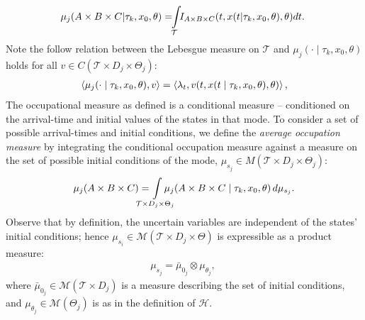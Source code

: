 \small
\begin{align}
\hspace*{-1mm}\mu_j(A\times B\times C| \tau_k ,x_0,\theta)=\hspace*{-1.25mm}\int\limits_{\mathcal T} \hspace*{-1.25mm} I_{A\times B\times C}(t,x(t|\tau_k,x_0,\theta),\theta)dt.
\end{align}
\normalsize
Note the follow relation between the Lebesgue measure on $\mathcal T$ and $\mu_j(\cdot\mid \tau_k,x_0,\theta)$ holds for all $v \in C(\mathcal T\times D_j\times \Theta_j)$:
\begin{align}
\left\langle \mu_j(\cdot\mid \tau_k,x_0,\theta),v\right\rangle=\left\langle \lambda_t,v(t,x(t\mid \tau_k,x_0,\theta),\theta)\right\rangle,
\label{eq:mu_lambda}
\end{align}
The occupational measure as defined is a conditional measure -- conditioned on the arrival-time and initial values of the states in that mode.
To consider a set of possible arrival-times and initial conditions, we define the \emph{average occupation measure} by integrating the conditional occupation measure against a measure on the set of possible initial conditions of the mode, $\mu_{s_j} \in  M(\mathcal T\times D_j\times \Theta_j)$:
\begin{align}
\mu_j(A\times B\times C)= \hspace*{-5mm}\int\limits_{\mathcal T\times D_j\times \Theta_j}\hspace*{-5mm}\mu_j(A\times B\times C\mid \tau_k,x_0,\theta)\,d \mu_{s_j}.
\label{eq:mu_avg}
\end{align}
Observe that by definition, the uncertain variables are independent of the states' initial conditions; hence $\mu_{s_i}\in \mathcal M(\mathcal T\times D_j\times \Theta)$ is expressible as a product measure:
\begin{align}
\mu_{s_j}=\bar\mu_{0_j}\otimes \mu_{\theta_j},\
\end{align}
where $\bar \mu_{0_j}\in \mathcal M(\mathcal T\times D_j)$ is a measure describing the set of initial conditions, and $\mu_{\theta_j}\in \mathcal M(\Theta_j)$ is as in the definition of $\mathcal H$.

